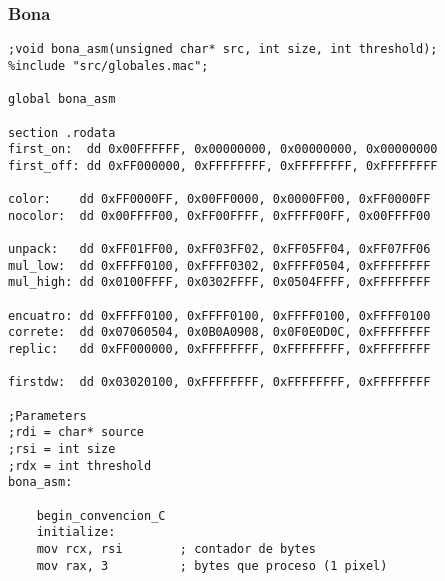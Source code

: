\subsubsection{Bona}
\begin{verbatim}
;void bona_asm(unsigned char* src, int size, int threshold);
%include "src/globales.mac";

global bona_asm

section .rodata
first_on:  dd 0x00FFFFFF, 0x00000000, 0x00000000, 0x00000000
first_off: dd 0xFF000000, 0xFFFFFFFF, 0xFFFFFFFF, 0xFFFFFFFF

color:    dd 0xFF0000FF, 0x00FF0000, 0x0000FF00, 0xFF0000FF
nocolor:  dd 0x00FFFF00, 0xFF00FFFF, 0xFFFF00FF, 0x00FFFF00

unpack:   dd 0xFF01FF00, 0xFF03FF02, 0xFF05FF04, 0xFF07FF06
mul_low:  dd 0xFFFF0100, 0xFFFF0302, 0xFFFF0504, 0xFFFFFFFF
mul_high: dd 0x0100FFFF, 0x0302FFFF, 0x0504FFFF, 0xFFFFFFFF

encuatro: dd 0xFFFF0100, 0xFFFF0100, 0xFFFF0100, 0xFFFF0100
correte:  dd 0x07060504, 0x0B0A0908, 0x0F0E0D0C, 0xFFFFFFFF
replic:   dd 0xFF000000, 0xFFFFFFFF, 0xFFFFFFFF, 0xFFFFFFFF

firstdw:  dd 0x03020100, 0xFFFFFFFF, 0xFFFFFFFF, 0xFFFFFFFF

;Parameters
;rdi = char* source
;rsi = int size
;rdx = int threshold
bona_asm:

    begin_convencion_C
    initialize:
    mov rcx, rsi        ; contador de bytes
    mov rax, 3          ; bytes que proceso (1 pixel)


\end{verbatim}

